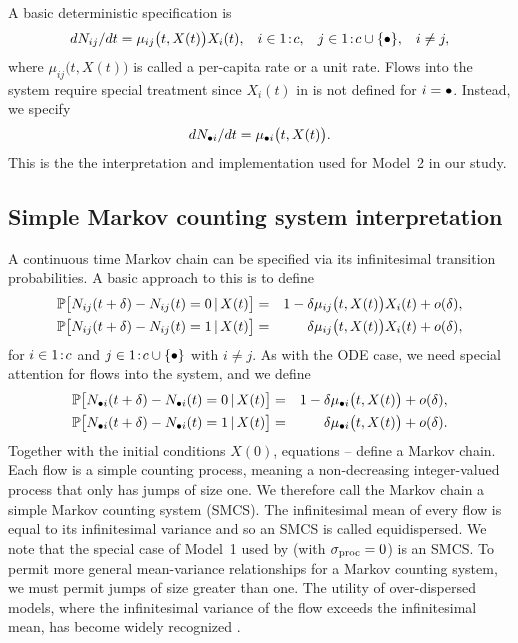 A basic deterministic specification is
\begin{equation}
\label{eq:ode1}
dN_{ij}/dt = \mu_{ij}\big(t,X(t) \big) X_i(t), \hspace{3mm} i\in {1}\!:\!{c}, \hspace{3mm} j\in {1}\!:\!{c} \cup\{\bullet\}, \hspace{3mm} i\neq j,
\end{equation}
where $\mu_{ij}\big(t,X(t)\big)$ is called a per-capita rate or a unit rate.
Flows into the system require special treatment since $X_i(t)$ in  is not defined for $i=\bullet$.
Instead, we specify
\begin{equation}
\label{eq:ode2}
dN_{\bullet i}/dt = \mu_{\bullet i}\big(t,X(t) \big).
\end{equation}
This is the the interpretation and implementation used for Model~2 in our study.

\subsection{Simple Markov counting system interpretation}
\label{subsec:smcs}
A continuous time Markov chain can be specified via its infinitesimal transition probabilities.
A basic approach to this is to define
\begin{eqnarray}
\label{eq:smcs1}
\mathbb{P}\big[ N_{ij}(t+\delta)-N_{ij}(t)=0 {\,\vert\,} X(t)\big]
 &=& 1-\delta \mu_{ij}\big(t,X(t)\big)X_i(t) + o(\delta),
\\
\label{eq:smcs2}
\mathbb{P}\big[ N_{ij}(t+\delta)-N_{ij}(t)=1 {\,\vert\,} X(t)\big]
 &=& \delta \mu_{ij}\big(t,X(t)\big)X_i(t) + o(\delta),
\end{eqnarray}
for $i\in {1}\!:\!{c}$ and $j\in{1}\!:\!{c}\cup\{\bullet\}$ with $i\neq j$.
As with the ODE case, we need special attention for flows into the system, and we define
\begin{eqnarray}
\label{eq:smcs3}
\mathbb{P}\big[ N_{\bullet i}(t+\delta)-N_{\bullet i}(t)=0 {\,\vert\,} X(t)\big]
 &=& 1-\delta \mu_{\bullet i}\big(t,X(t)\big) + o(\delta),
\\
\label{eq:smcs4}
\mathbb{P}\big[ N_{\bullet i}(t+\delta)-N_{\bullet i}(t)=1 {\,\vert\,} X(t)\big]
 &=& \delta \mu_{\bullet i}\big(t,X(t)\big) + o(\delta).
\end{eqnarray}
Together with the initial conditions $X(0)$, equations -- define a Markov chain.
Each flow is a simple counting process, meaning a non-decreasing integer-valued process that only has jumps of size one.
We therefore call the Markov chain a simple Markov counting system (SMCS).
The infinitesimal mean of every flow is equal to its infinitesimal variance \cite{breto11} and so an SMCS is called equidispersed.
We note that the special case of Model~1 used by \cite{lee20} (with $\sigma_{\mathrm{proc}} = 0$) is an SMCS.
To permit more general mean-variance relationships for a Markov counting system, we must permit jumps of size greater than one.
The utility of over-dispersed models, where the infinitesimal variance of the flow exceeds the infinitesimal mean, has become widely recognized \cite{stocks20,he10}.

